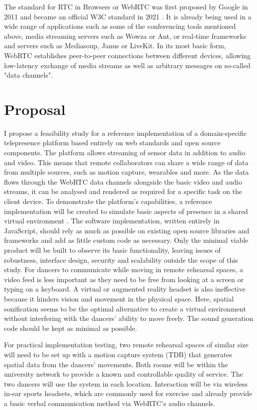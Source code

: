 The standard for \ac{RTC} in Browsers or WebRTC \parencite{webRtcSpec} was first proposed by Google in 2011 and became an official \ac{W3C} standard in 2021 \parencite{webRtcOfficialWebStandard}. It is already being used in a wide range of applications such as some of the conferencing tools mentioned above, media streaming servers such as Wowza or Ant, or real-time frameworks and servers such as Mediasoup, Janus or LiveKit. In its most basic form, WebRTC establishes peer-to-peer connections between different devices, allowing low-latency exchange of media streams as well as arbitrary messages on so-called "data channels".

\section{Proposal}
I propose a feasibility study for a reference implementation of a domain-specific telepresence platform based entirely on web standards and open source components. The platform allows streaming of sensor data in addition to audio and video. This means that remote collaborators can share a wide range of data from multiple sources, such as motion capture, wearables and more. As the data flows through the WebRTC data channels alongside the basic video and audio streams, it can be analysed and rendered as required for a specific task on the client device.
To demonstrate the platform's capabilities, a reference implementation will be created to simulate basic aspects of presence in a shared virtual environment \parencite{surveyOfPresence}. The software implementation, written entirely in JavaScript, should rely as much as possible on existing open source libraries and frameworks and add as little custom code as necessary. Only the minimal viable product will be built to observe its basic functionality, leaving issues of robustness, interface design, security and scalability outside the scope of this study.
For dancers to communicate while moving in remote rehearsal spaces, a video feed is less important as they need to be free from looking at a screen or typing on a keyboard. A virtual or augmented reality headset is also ineffective because it hinders vision and movement in the physical space. Here, spatial sonification seems to be the optimal alternative to create a virtual environment without interfering with the dancers' ability to move freely. The sound generation code should be kept as minimal as possible.

For practical implementation testing, two remote rehearsal spaces of similar size will need to be set up with a motion capture system (TDB) that generates spatial data from the dancers' movements. Both rooms will be within the university network to provide a known and controllable quality of service. The two dancers will use the system in each location. Interaction will be via wireless in-ear sports headsets, which are commonly used for exercise and already provide a basic verbal communication method via WebRTC's audio channels.

